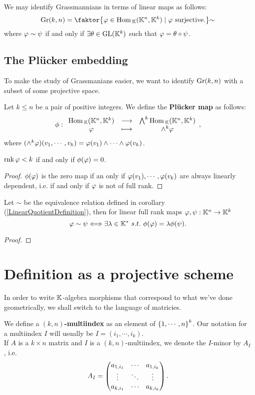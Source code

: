 \begin{corollary}\label{LinearQuotientDefinition}
We may identify Grassmannians in terms of linear maps as follows:
\[\Gr(k,n)=\quot{\cpa{\vp\in \Hom_\K(\K^n,\K^k)\mid \vp\ \text{surjective.}}}\sim\]
where $\varphi\sim \psi$ if and only if $\exists \theta\in \mathrm{GL}(\mathbb{K}^k)$ such that $\varphi=\theta\circ \psi$.
\end{corollary}

\subsection{The Pl\"ucker embedding}
To make the study of Grassmanians easier, we want to identify $\mathrm{Gr}(k,n)$ with a subset of some projective space.

\begin{definition}
Let $k\leq n$ be a pair of positive integers. We define the \textbf{Pl\"ucker map} as follows:
\[\phi:\begin{array}{ccc} {\mathrm{Hom}\,_{\mathbb{K}}(\mathbb{K}^n,\mathbb{K}^k)} & \longrightarrow & {\bigwedge^k\mathrm{Hom}\,_{\mathbb{K}}(\mathbb{K}^n,\mathbb{K}^k)}\\ {\varphi} & \longmapsto & {\wedge^k\varphi} \end{array},\]
where $(\wedge^k\varphi)(v_1,\cdots, v_k)=\varphi(v_1)\wedge\cdots\wedge\varphi(v_k)$.
\end{definition}
\begin{remark}
$\mathrm{rnk}\, \varphi<k$ if and only if $\phi(\varphi)=0$.
\end{remark}
\begin{proof}
$\phi(\varphi)$ is the zero map if an only if $\varphi(v_1),\cdots, \varphi(v_k)$ are always linearly dependent, i.e. if and only if $\varphi$ is not of full rank.
\end{proof}

\begin{proposition}\label{PluckerMapInjectiveOnGrassmaniansUpToScalar}
Let $\sim$ be the equivalence relation defined in corollary (\ref{LinearQuotientDefinition}), then for linear full rank maps $\varphi,\psi:\mathbb{K}^n\to \mathbb{K}^k$
\[\vp\sim \psi\coimplies \exists \la\in\K^\ast\ s.t.\ \phi(\vp)=\la\phi(\psi).\]
\end{proposition}
\begin{proof}

\end{proof}

\section{Definition as a projective scheme}
In order to write $\mathbb{K}$-algebra morphisms that correspond to what we've done geometrically, we shall switch to the language of matricies.
\begin{definition}[Multiindicies]
We define a \textbf{$(k,n)$-multiindex} as an element of $\left\{{1,\cdots, n}\right\}^k$. Our notation for a multiindex $I$ will usually be $I=(i_1,\cdots, i_k)$.\\
If $A$ is a $k\times n$ matrix and $I$ is a $(k,n)$-multiindex, we denote the $I$-minor by $A_I$, i.e.
\[A_I=\begin{pmatrix}a_{1,i_1} &\cdots &a_{1,i_{k}}\\\vdots &\ddots &\vdots\\a_{k,i_1}&\cdots&a_{k,i_k}\end{pmatrix}.\]
\end{definition}




